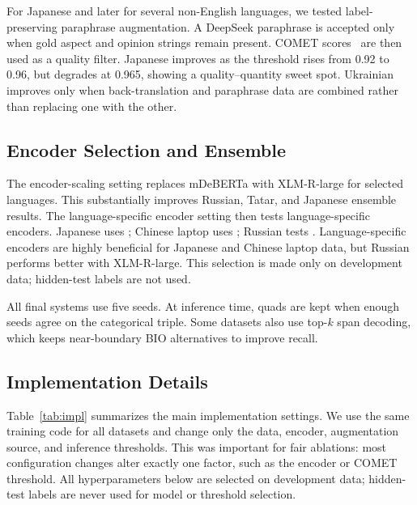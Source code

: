 \documentclass[runningheads]{llncs}
\begin{document}
For Japanese and later for several non-English languages, we tested
label-preserving paraphrase augmentation. A DeepSeek paraphrase is
accepted only when gold aspect and opinion strings remain present.
COMET scores~\cite{rei2022comet} are then used as a quality filter. Japanese improves as
the threshold rises from 0.92 to 0.96, but degrades at 0.965, showing
a quality--quantity sweet spot. Ukrainian improves only when
back-translation and paraphrase data are combined rather than replacing
one with the other.

\subsection{Encoder Selection and Ensemble}

The encoder-scaling setting replaces mDeBERTa with XLM-R-large for selected languages. This
substantially improves Russian, Tatar, and Japanese ensemble results.
The language-specific encoder setting then tests language-specific encoders. Japanese uses
; Chinese laptop uses
; Russian tests
. Language-specific encoders are
highly beneficial for Japanese and Chinese laptop data, but Russian
performs better with XLM-R-large. This selection is made only on
development data; hidden-test labels are not used.

All final systems use five seeds. At inference time, quads are kept
when enough seeds agree on the categorical triple. Some datasets also
use top-$k$ span decoding, which keeps near-boundary BIO alternatives
to improve recall.

\subsection{Implementation Details}

Table~\ref{tab:impl} summarizes the main implementation settings. We
use the same training code for all datasets and change only the data,
encoder, augmentation source, and inference thresholds. This was
important for fair ablations: most configuration changes alter exactly one
factor, such as the encoder or COMET threshold. All hyperparameters
below are selected on development data; hidden-test labels are never
used for model or threshold selection.
\end{document}
